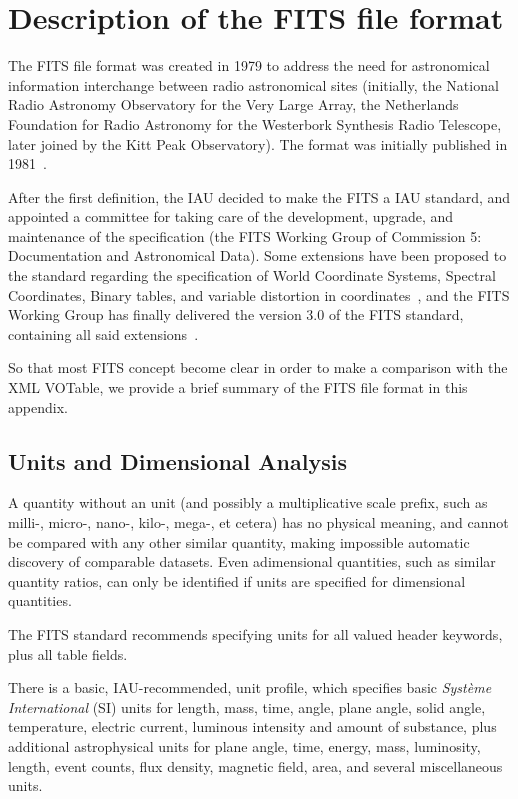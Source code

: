 \chapter{Description of the FITS file format} %
\label{cha:description_of_the_fits_file_format}

The FITS file format was created in 1979 to address the need for
astronomical information interchange between radio astronomical sites
(initially, the National Radio Astronomy Observatory for the Very Large
Array, the Netherlands Foundation for Radio Astronomy for the Westerbork
Synthesis Radio Telescope, later joined by the Kitt Peak Observatory).
The format was initially published in 1981~\cite{1981A&AS...44..363W}.

After the first definition, the IAU decided to make the FITS a IAU
standard, and appointed a committee for taking care of the development,
upgrade, and maintenance of the specification (the FITS Working Group of
Commission 5: Documentation and Astronomical Data). Some extensions have
been proposed to the standard regarding the specification of World
Coordinate Systems, Spectral Coordinates, Binary tables, and variable
distortion in coordinates~\cite{2002A&A...395.1061G,
2004ASPC..314..551C, 2006A&A...446..747G}, and the FITS Working Group
has finally delivered the version 3.0 of the FITS standard, containing
all said extensions~\cite{FITS-Working-Group:2008ty}.

So that most FITS concept become clear in order to make a comparison
with the XML VOTable, we provide a brief summary of the FITS file format
in this appendix.

\section{Units and Dimensional Analysis} %
\label{sec:units}

A quantity without an unit (and possibly a multiplicative scale prefix,
such as milli-, micro-, nano-, kilo-, mega-, et cetera) has no physical
meaning, and cannot be compared with any other similar quantity, making
impossible automatic discovery of comparable datasets. Even adimensional
quantities, such as similar quantity ratios, can only be identified if
units are specified for dimensional quantities.

The FITS standard recommends specifying units for all valued header
keywords, plus all table fields.

There is a basic, IAU-recommended, unit profile, which specifies basic
\emph{Système International} (SI) units for length, mass, time, angle,
plane angle, solid angle, temperature, electric current, luminous
intensity and amount of substance, plus additional astrophysical
units for plane angle, time, energy, mass, luminosity, length, event
counts, flux density, magnetic field, area, and several miscellaneous
units.




